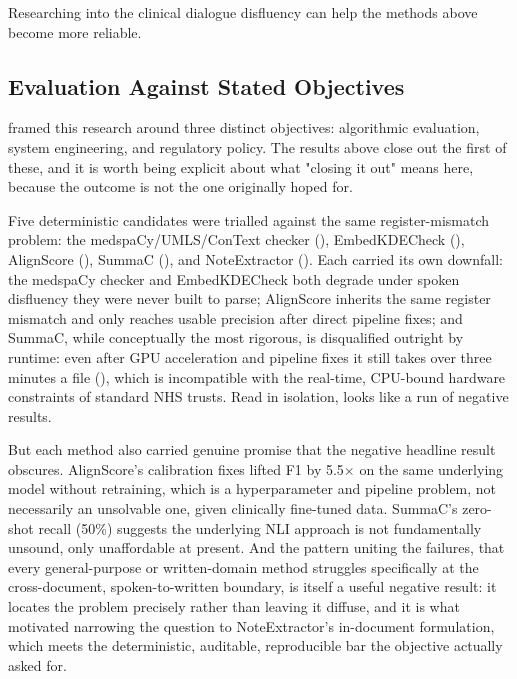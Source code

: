 \documentclass[11pt,a4paper]{article}
\begin{document}
Researching into the clinical dialogue disfluency can help the methods above become more reliable.

\subsection{Evaluation Against Stated Objectives}
\label{sec:Evaluation Against Stated Objectives}

 framed this research around three distinct objectives: algorithmic evaluation, system engineering, and regulatory policy. The results above close out the first of these, and it is worth being explicit about what "closing it out" means here, because the outcome is not the one originally hoped for.

Five deterministic candidates were trialled against the same register-mismatch problem: the medspaCy/UMLS/ConText checker (), EmbedKDECheck (), AlignScore (), SummaC (), and NoteExtractor (). Each carried its own downfall: the medspaCy checker and EmbedKDECheck both degrade under spoken disfluency they were never built to parse; AlignScore inherits the same register mismatch and only reaches usable precision after direct pipeline fixes; and SummaC, while conceptually the most rigorous, is disqualified outright by runtime: even after GPU acceleration and pipeline fixes it still takes over three minutes a file (), which is incompatible with the real-time, CPU-bound hardware constraints of standard NHS trusts. Read in isolation,  looks like a run of negative results.

But each method also carried genuine promise that the negative headline result obscures. AlignScore's calibration fixes lifted F1 by 5.5$\times$ on the same underlying model without retraining, which is a hyperparameter and pipeline problem, not necessarily an unsolvable one, given clinically fine-tuned data. SummaC's zero-shot recall (50\%) suggests the underlying NLI approach is not fundamentally unsound, only unaffordable at present. And the pattern uniting the failures, that every general-purpose or written-domain method struggles specifically at the cross-document, spoken-to-written boundary, is itself a useful negative result: it locates the problem precisely rather than leaving it diffuse, and it is what motivated narrowing the question to NoteExtractor's in-document formulation, which meets the deterministic, auditable, reproducible bar the objective actually asked for.
\end{document}
